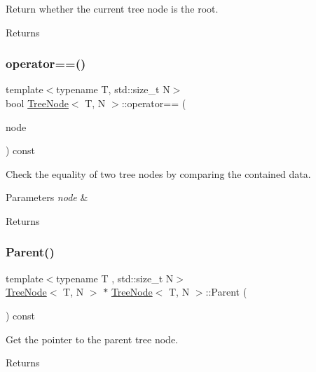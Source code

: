 Return whether the current tree node is the root. \begin{DoxyReturn}{Returns}

\end{DoxyReturn}
\mbox{\label{classTreeNode_a9446085d81c4266ca30a384001f55b12}} 
\subsubsection{\texorpdfstring{operator==()}{operator==()}}
{\footnotesize\ttfamily template$<$typename T, std\+::size\+\_\+t N$>$ \\
bool \hyperlink{classTreeNode}{Tree\+Node}$<$ T, N $>$\+::operator== (\begin{DoxyParamCaption}\item[{const \hyperlink{classTreeNode}{Tree\+Node}$<$ T, N $>$ \&}]{node }\end{DoxyParamCaption}) const}

Check the equality of two tree nodes by comparing the contained data. 
\begin{DoxyParams}{Parameters}
{\em node} & \\
\hline
\end{DoxyParams}
\begin{DoxyReturn}{Returns}

\end{DoxyReturn}
\mbox{\label{classTreeNode_a66c83bfefdb235d5cb4a299eb5044465}} 
\subsubsection{\texorpdfstring{Parent()}{Parent()}\hspace{0.1cm}{\footnotesize\ttfamily [1/2]}}
{\footnotesize\ttfamily template$<$typename T , std\+::size\+\_\+t N$>$ \\
\hyperlink{classTreeNode}{Tree\+Node}$<$ T, N $>$ $\ast$ \hyperlink{classTreeNode}{Tree\+Node}$<$ T, N $>$\+::Parent (\begin{DoxyParamCaption}\item[{void}]{ }\end{DoxyParamCaption}) const}

Get the pointer to the parent tree node. \begin{DoxyReturn}{Returns}

\end{DoxyReturn}



